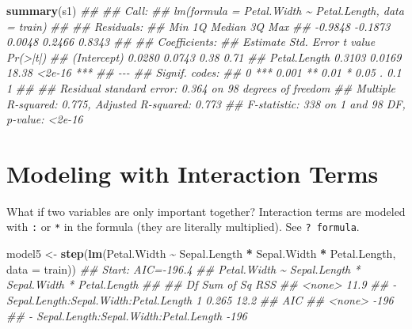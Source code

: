 \documentclass[
  notitlepage]{book}
\newenvironment{Shaded}{\begin{snugshade}}{\end{snugshade}}
\newcommand{\CommentTok}[1]{\textcolor[rgb]{0.56,0.35,0.01}{\textit{#1}}}
\newcommand{\DataTypeTok}[1]{\textcolor[rgb]{0.13,0.29,0.53}{#1}}
\newcommand{\KeywordTok}[1]{\textcolor[rgb]{0.13,0.29,0.53}{\textbf{#1}}}
\newcommand{\NormalTok}[1]{#1}
\newcommand{\OperatorTok}[1]{\textcolor[rgb]{0.81,0.36,0.00}{\textbf{#1}}}
\newcommand{\StringTok}[1]{\textcolor[rgb]{0.31,0.60,0.02}{#1}}
\begin{document}
\begin{Shaded}
\begin{Highlighting}[]
\KeywordTok{summary}\NormalTok{(s1)}
\CommentTok{\#\# }
\CommentTok{\#\# Call:}
\CommentTok{\#\# lm(formula = Petal.Width \textasciitilde{} Petal.Length, data = train)}
\CommentTok{\#\# }
\CommentTok{\#\# Residuals:}
\CommentTok{\#\#     Min      1Q  Median      3Q     Max }
\CommentTok{\#\# {-}0.9848 {-}0.1873  0.0048  0.2466  0.8343 }
\CommentTok{\#\# }
\CommentTok{\#\# Coefficients:}
\CommentTok{\#\#              Estimate Std. Error t value Pr(\textgreater{}|t|)    }
\CommentTok{\#\# (Intercept)    0.0280     0.0743    0.38     0.71    }
\CommentTok{\#\# Petal.Length   0.3103     0.0169   18.38   \textless{}2e{-}16 ***}
\CommentTok{\#\# {-}{-}{-}}
\CommentTok{\#\# Signif. codes:  }
\CommentTok{\#\# 0 \textquotesingle{}***\textquotesingle{} 0.001 \textquotesingle{}**\textquotesingle{} 0.01 \textquotesingle{}*\textquotesingle{} 0.05 \textquotesingle{}.\textquotesingle{} 0.1 \textquotesingle{} \textquotesingle{} 1}
\CommentTok{\#\# }
\CommentTok{\#\# Residual standard error: 0.364 on 98 degrees of freedom}
\CommentTok{\#\# Multiple R{-}squared:  0.775,  Adjusted R{-}squared:  0.773 }
\CommentTok{\#\# F{-}statistic:  338 on 1 and 98 DF,  p{-}value: \textless{}2e{-}16}
\end{Highlighting}
\end{Shaded}

\hypertarget{modeling-with-interaction-terms}{%
\section{Modeling with Interaction Terms}\label{modeling-with-interaction-terms}}

What if two variables are only important together? Interaction terms
are modeled with \texttt{:} or \texttt{*} in the formula (they are literally multiplied).
See \texttt{?\ formula}.

\begin{Shaded}
\begin{Highlighting}[]
\NormalTok{model5 \textless{}{-}}\StringTok{ }\KeywordTok{step}\NormalTok{(}\KeywordTok{lm}\NormalTok{(Petal.Width }\OperatorTok{\textasciitilde{}}\StringTok{ }\NormalTok{Sepal.Length }\OperatorTok{*}\StringTok{ }
\StringTok{                    }\NormalTok{Sepal.Width }\OperatorTok{*}\StringTok{ }\NormalTok{Petal.Length,}
             \DataTypeTok{data =}\NormalTok{ train))}
\CommentTok{\#\# Start:  AIC={-}196.4}
\CommentTok{\#\# Petal.Width \textasciitilde{} Sepal.Length * Sepal.Width * Petal.Length}
\CommentTok{\#\# }
\CommentTok{\#\#                                         Df Sum of Sq  RSS}
\CommentTok{\#\# \textless{}none\textgreater{}                                               11.9}
\CommentTok{\#\# {-} Sepal.Length:Sepal.Width:Petal.Length  1     0.265 12.2}
\CommentTok{\#\#                                          AIC}
\CommentTok{\#\# \textless{}none\textgreater{}                                  {-}196}
\CommentTok{\#\# {-} Sepal.Length:Sepal.Width:Petal.Length {-}196}
\end{Highlighting}
\end{Shaded}
\end{document}
